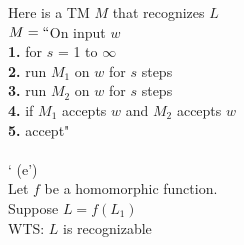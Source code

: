 \documentclass[preview]{standalone} %
\begin{document}
Here is a TM $M$ that recognizes $L$\\
$M=``$On input $w$\\
\hspace*{8mm} \textbf{1.} for $s$ = 1 to $\infty$\\
\hspace*{8mm} \textbf{2.} \qquad run $M_1$ on $w$ for $s$ steps\\
\hspace*{8mm} \textbf{3.} \qquad run $M_2$ on $w$ for $s$ steps\\
\hspace*{8mm} \textbf{4.} \qquad if $M_1$ accepts $w$ and $M_2$ accepts $w$\\
\hspace*{8mm} \textbf{5.} \qquad \qquad accept"\\\\
`
(e')\\
Let $f$ be a homomorphic function.\\
Suppose $L = f(L_1)$\\
WTS: $L$ is recognizable\\
\end{document}
